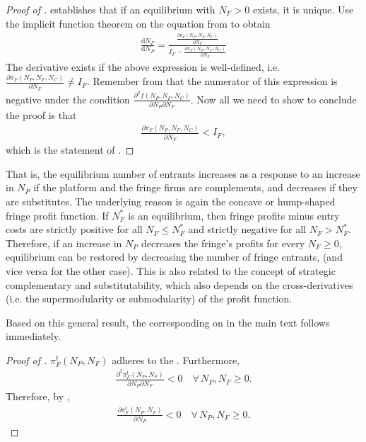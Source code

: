 \documentclass[a4paper]{article}
\newcommand{\dd}{\mathrm{d}}
\begin{document}
\begin{proof}[Proof of ]
     establishes that if an equilibrium with $N_F > 0$ exists, it is unique.
    Use the implicit function theorem on the equation from  to obtain
    \begin{align*}
        \frac{\dd N_F}{\dd N_P} = \frac{\frac{\partial \pi_F(N_P, N_F, N_C)}{\partial N_P}}{I_F - \frac{\partial \pi_F (N_P, N_F, N_C)}{\partial N_F}}
    \end{align*}
    The derivative exists if the above expression is well-defined, i.e. $\frac{\partial \pi_F (N_P, N_F, N_C)}{\partial N_F} \neq I_F$.
    Remember from  that the numerator of this expression is negative under the condition $\frac{\partial^2 f(N_P, N_F, N_C)}{\partial N_P \partial N_F}$.
    Now all we need to show to conclude the proof is that
    \begin{align*}
        \frac{\partial \pi_F (N_P, N_F, N_C)}{\partial N_F} < I_F,
    \end{align*}
    which is the statement of .
\end{proof}

That is, the equilibrium number of entrants increases as a response to an increase in $N_P$ if the platform and the fringe firms are complements, and decreases if they are substitutes.
The underlying reason is again the concave or hump-shaped fringe profit function.
If $N_F^*$ is an equilibrium, then fringe profits minus entry costs are strictly positive for all $N_F \leq N_F^*$ and strictly negative for all $N_F > N_F^*$.
Therefore, if an increase in $N_P$ decreases the fringe's profits for every $N_F \geq 0$, equilibrium can be restored by decreasing the number of fringe entrants, (and vice versa for the other case).
This is also related to the concept of strategic complementary and substitutability, which also depends on the cross-derivatives (i.e. the supermodularity or submodularity) of the profit function.

Based on this general result, the corresponding on in the main text follows immediately.
\begin{proof}[Proof of ]
    $\pi^t_F(N_P ,N_F)$ adheres to the .
    Furthermore, 
    \begin{align*}
        \frac{\partial^2 \pi^t_F(N_P ,N_F)}{\partial N_P \partial N_F} < 0 \quad \forall\, N_P, N_F \geq 0.
    \end{align*}
    Therefore, by ,
    \begin{align*}
        \frac{\partial \pi^t_F(N_P, N_F)}{\partial N_P} < 0 \quad \forall\, N_P, N_F \geq 0.
    \end{align*}
\end{proof}
\end{document}
